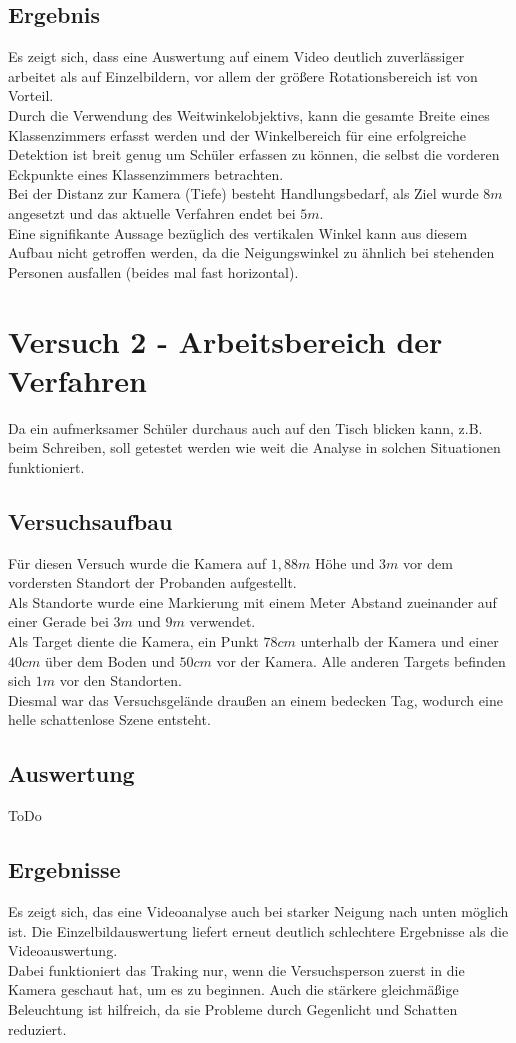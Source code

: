 \subsection{Ergebnis}
Es zeigt sich, dass eine Auswertung auf einem Video deutlich zuverlässiger arbeitet als auf Einzelbildern, vor allem der größere Rotationsbereich ist von Vorteil.\\
Durch die Verwendung des Weitwinkelobjektivs, kann die gesamte Breite eines Klassenzimmers erfasst werden und der Winkelbereich für eine erfolgreiche Detektion ist breit genug um Schüler erfassen zu können, die selbst die vorderen Eckpunkte eines Klassenzimmers betrachten.\\
Bei der Distanz zur Kamera (Tiefe) besteht Handlungsbedarf, als Ziel wurde $8m$ angesetzt und das aktuelle Verfahren endet bei $5m$.\\
Eine signifikante Aussage bezüglich des vertikalen Winkel kann aus diesem Aufbau nicht getroffen werden, da die Neigungswinkel zu ähnlich bei stehenden Personen ausfallen (beides mal fast horizontal).
\section{Versuch 2 - Arbeitsbereich der Verfahren}
Da ein aufmerksamer Schüler durchaus auch auf den Tisch blicken kann, z.B. beim Schreiben, soll getestet werden wie weit die Analyse in solchen Situationen funktioniert.
\subsection{Versuchsaufbau}
Für diesen Versuch wurde die Kamera auf $1,88m$ Höhe und $3m$ vor dem vordersten Standort der Probanden aufgestellt.\\
Als Standorte wurde eine Markierung mit einem Meter Abstand zueinander auf einer Gerade bei $3m$ und $9m$ verwendet.\\
Als Target diente die Kamera, ein Punkt $78cm$ unterhalb der Kamera und einer $40cm$ über dem Boden und $50cm$ vor der Kamera. Alle anderen Targets befinden sich $1m$ vor den Standorten.\\
Diesmal war das Versuchsgelände draußen an einem bedecken Tag, wodurch eine helle schattenlose Szene entsteht.
\subsection{Auswertung}
ToDo
\subsection{Ergebnisse}
Es zeigt sich, das eine Videoanalyse auch bei starker Neigung nach unten möglich ist. Die Einzelbildauswertung liefert erneut deutlich schlechtere Ergebnisse als die Videoauswertung.\\
Dabei funktioniert das Traking nur, wenn die Versuchsperson zuerst in die Kamera geschaut hat, um es zu beginnen. Auch die stärkere gleichmäßige Beleuchtung ist hilfreich, da sie Probleme durch Gegenlicht und Schatten reduziert.
